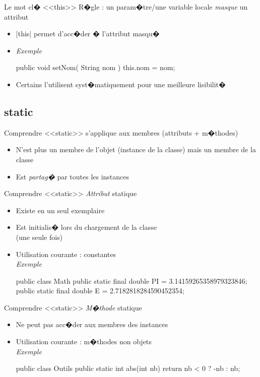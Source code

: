 \begin{frame}[fragile]{Le mot cl� <<this>>}
R�gle : un param�tre/une variable locale \emph{masque} un attribut
  \begin{itemize}
  \item \java|this| permet d'acc�der � l'attribut masqu� 
  \item \emph{Exemple}
  \begin{Java}
  public void setNom( String nom ) {
    this.nom = nom;
  }
  \end{Java}
  \item Certains l'utilisent syst�matiquement pour une meilleure lisibilit�
  \end{itemize}
\end{frame}

\subsection{static}

\begin{frame}{Comprendre <<static>>}
  \emph{} s'applique aux membres (attributs + m�thodes)
  \begin{itemize}
    \item N'est plus un membre de l'objet (instance de la classe) mais un membre de la classe
    \item Est \emph{partag�} par toutes les instances
  \end{itemize}
\end{frame}

\begin{frame}[fragile]{Comprendre <<static>>}
  \emph{Attribut} statique
  \begin{itemize}
    \item Existe en un seul exemplaire 
    \item Est initialis� lors du chargement de la classe \\(une seule fois)
    \item Utilisation courante : constantes
  \\\emph{Exemple}
  \begin{Java}
  public class Math { 
    public static final double PI = 3.14159265358979323846;
    public static final double E = 2.7182818284590452354;
  }
  \end{Java}
  \end{itemize}
\end{frame}

\begin{frame}[fragile]{Comprendre <<static>>}
  \emph{M�thode} statique
  \begin{itemize}
    \item Ne peut pas acc�der aux membres des instances
    \item Utilisation courante : m�thodes non objets
  \\\emph{Exemple}
  \begin{Java}
  public class Outils {
    public static int abs(int nb) {
      return nb < 0 ? -nb : nb;
    }
  }
  \end{Java}
  \end{itemize}
\end{frame}

